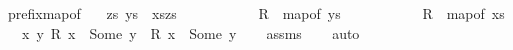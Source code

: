 \begin{isabellebody}
\isanewline
{}\isamarkupfalse%
\ prefix{\isacharunderscore}{\kern0pt}map{\isacharunderscore}{\kern0pt}of{\isacharcolon}{\kern0pt}\isanewline
\ \ \ {\isachardoublequoteopen}{\isasymexists}zs{\isachardot}{\kern0pt}\ ys\ {\isacharequal}{\kern0pt}\ xs{\isacharat}{\kern0pt}zs{\isachardoublequoteclose}\ \isanewline
\ \ \ \ \ \ \ \ \ \ {\isachardoublequoteopen}R{}\ {\isacharequal}{\kern0pt}\ map{\isacharunderscore}{\kern0pt}of\ ys{\isachardoublequoteclose}\ \isanewline
\ \ \ \ \ \ \ \ \ \ {\isachardoublequoteopen}R{}\ {\isacharequal}{\kern0pt}\ map{\isacharunderscore}{\kern0pt}of\ xs{\isachardoublequoteclose}\isanewline
\ \ \ {\isachardoublequoteopen}{\isasymforall}x\ y{\isachardot}{\kern0pt}\ R{}\ x\ {\isacharequal}{\kern0pt}\ Some\ y\ {\isasymlongrightarrow}\ R{}\ x\ {\isacharequal}{\kern0pt}\ Some\ y{\isachardoublequoteclose}\isanewline
%
\isadelimproof
\ \ %
\endisadelimproof
%
\isatagproof
{}\isamarkupfalse%
\ assms\isanewline
\ \ \isamarkupfalse%
\ auto%
\endisatagproof
{\isafoldproof}%
%
\isadelimproof
\isanewline
%
\endisadelimproof
%
\isadelimtheory
\isanewline
%
\endisadelimtheory
%
\isatagtheory
{}\isamarkupfalse%
%
\endisatagtheory
{\isafoldtheory}%
%
\isadelimtheory
%
\endisadelimtheory
%
\end{isabellebody}%
\endinput
